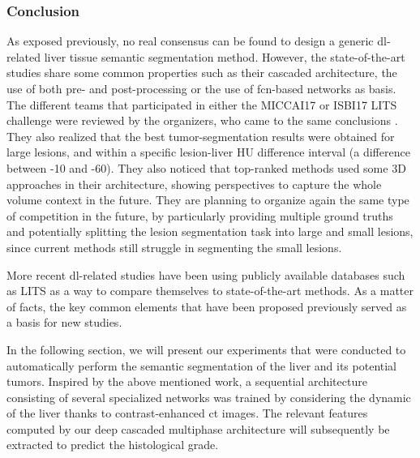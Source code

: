 \subsubsection{Conclusion}

As exposed previously, no real consensus can be found to design a
generic \ac{dl}-related liver tissue semantic segmentation method. However,
the state-of-the-art studies share some common properties such as their
cascaded architecture, the use of both pre- and post-processing or the
use of \ac{fcn}-based networks as basis.
The different teams that participated in either the MICCAI17 or ISBI17
LITS challenge were reviewed by the organizers, who came to the same
conclusions \cite{Bilic2019}.
They also realized that the best tumor-segmentation results were
obtained for large lesions, and within a specific lesion-liver HU
difference interval (a difference between -10 and -60).
They also noticed that top-ranked methods used some 3D approaches in
their architecture, showing perspectives to capture the whole
volume context in the future. They are planning to organize again the same
type of competition in the future, by particularly providing multiple
ground truths and potentially splitting the lesion segmentation task
into large and small lesions, since current methods still struggle in
segmenting the small lesions.

More recent \ac{dl}-related studies have been using publicly available
databases such as LITS as a way to compare themselves to
state-of-the-art methods. As a matter of facts, the key common elements
that have been proposed previously served as a basis for new studies.

In the following section, we will present our experiments that were conducted to automatically perform the semantic segmentation of the liver and its potential tumors. Inspired by the above mentioned work, a sequential architecture consisting of several specialized networks was trained by considering the dynamic of the liver thanks to contrast-enhanced \ac{ct} images. The relevant features computed by our deep cascaded multiphase architecture will subsequently be extracted to predict the histological grade.


%

